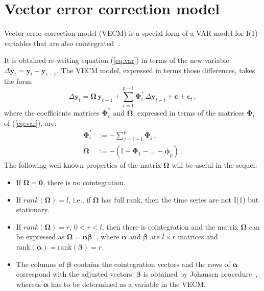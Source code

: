 \section{Vector error correction model}
Vector error correction model (VECM) is a special form of a VAR model for I(1) variables that are also
cointegrated~\cite{banerjee1993}.

It is obtained re-writing equation (\ref{eq:var}) in terms of the new
variable $\Delta\mathbf{y}_t=\mathbf{y}_t-\mathbf{y}_{t-1}$.
The VECM model, expressed in terms those differences, takes the form:
\begin{equation}\label{eq:vec}
\Delta \mathbf{y}_t 
= \boldsymbol{\Omega}\,\mathbf{y}_{t-1}
  + \sum_{i=1}^{p-1} \boldsymbol{\Phi}_i^*\,\Delta\mathbf{y}_{t-i}
  + \mathbf{c} + \boldsymbol{\epsilon}_t\,,
\end{equation}
\noindent
where the coefficients matrices $\boldsymbol{\Phi}_i^*$ and 
$\boldsymbol{\Omega}$, expressed in terms of the matrices
$\boldsymbol{\Phi}_i$ of (\ref{eq:var}), are:
\begin{align*}
\boldsymbol{\Phi}_i^* 
&:= -\sum_{j=i+1}^{p}\boldsymbol{\Phi}_j\,, \\
\boldsymbol{\Omega}
&:= -\left( \mathbb{I} - \boldsymbol{\Phi}_1 - \dots 
    - \boldsymbol{\phi}_p \right)\,. 
\end{align*}
The following well known properties of the matrix $\boldsymbol{\Omega}$
\cite{johansen1995} will be useful in the sequel:
\begin{itemize}
\item
If $\boldsymbol{\Omega} = \mathbf{0}$, there is no cointegration.
\item 
If $rank(\boldsymbol{\Omega})=l$, i.e., if $\boldsymbol{\Omega}$ has
full rank, then the time series are not I(1) but stationary.
\item
If $rank(\boldsymbol{\Omega})=r$, $0<r<l$, then there is cointegration
and the matrix $\boldsymbol{\Omega}$ can be expressed as
$\boldsymbol{\Omega}=\boldsymbol{\alpha\beta}^\top$, where $\boldsymbol{\alpha}$
and $\boldsymbol{\beta}$ are
$l\times r$ matrices and
$\text{rank}(\boldsymbol{\alpha})=\text{rank}(\boldsymbol{\beta})=r$.
\item
The columns of $\boldsymbol{\beta}$ contains the cointegration vectors and the rows of
$\boldsymbol{\alpha}$ correspond with the adjusted vectors. 
$\boldsymbol{\beta}$ is obtained by Johansen procedure~\cite{johansen1988},
whereas $\boldsymbol{\alpha}$ has to be determined as a variable in the VECM.
\end{itemize}
